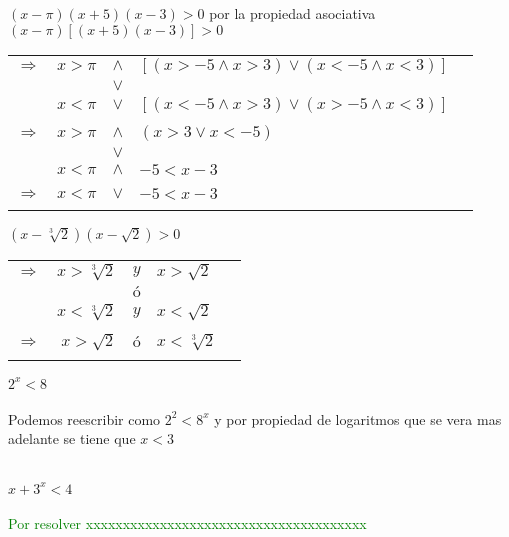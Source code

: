 \begin{ej}
$(x-\pi)(x+5)(x-3)>0$ por la propiedad asociativa $(x-\pi)\left[ (x+5)(x-3) \right]>0$
\begin{center}
\begin{tabular}{crcll}\\
$\Rightarrow$&$x>\pi$&$\land$&$\left[(x>-5\land x>3) \lor (x<-5 \land x<3) \right]$&\\
&&$\lor$&\\
&$x< \pi $&$\lor$&$\left[ (x<-5 \land x>3) \lor (x>-5 \land x<3) \right]$&\\\\
$\Rightarrow$&$x > \pi $&$\land$&$(x>3 \lor x<-5)$&\\
&&$\lor$&&\\
&$x<\pi$&$\land$&$-5<x-3$&\\\\
$\Rightarrow$&$x<\pi$&$\lor$&$-5<x-3$&\\\\
\end{tabular}
\end{center}
\end{ej}
\vspace{1cm}

\begin{ej}
$(x-\sqrt[3]{2})(x-\sqrt{2})>0$
\begin{center}
\begin{tabular}{crcll}
$\Rightarrow$&$x>\sqrt[3]{2}$&$y$&$x>\sqrt{2}$&\\
&&$ó$&&\\
&$x<\sqrt[3]{2}$&$y$&$x<\sqrt{2}$&\\\\
$\Rightarrow$&$x>\sqrt{2}$&$ó$&$x<\sqrt[3]{2}$&\\\\
\end{tabular}
\end{center}
\end{ej}

\begin{ej}
$2^x<8$\\\\
Podemos reescribir como $2^2<8^x$ y por propiedad de logaritmos que se vera mas adelante se tiene que $x<3$\\\\
\end{ej}

\begin{ej}
$x+3^x <4$\\\\
\textcolor{green}{Por resolver xxxxxxxxxxxxxxxxxxxxxxxxxxxxxxxxxxxxxx}	
\end{ej}

